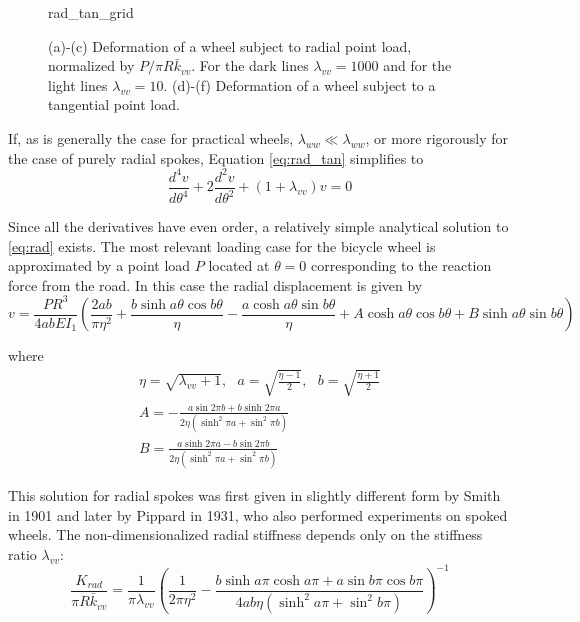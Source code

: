 \documentclass[../thesis.tex]{subfiles}
\newcommand{\dt}[2]{\frac{d^#2#1}{d\theta^#2}}
\begin{document}
\begin{figure}
\centering
{rad_tan_grid}
\caption{(a)-(c) Deformation of a wheel subject to radial point load, normalized by $P/\pi R\bar{k}_{vv}$. For the dark lines $\lambda_{vv}=1000$ and for the light lines $\lambda_{vv}=10$. (d)-(f) Deformation of a wheel subject to a tangential point load.}
\label{fig:rad_tan_grid}
\end{figure}

If, as is generally the case for practical wheels, $\lambda_{ww} \ll \lambda_{ww}$, or more rigorously for the case of purely radial spokes, Equation \eqref{eq:rad_tan} simplifies to
\begin{equation}
\label{eq:rad}
\dt{v}{4} + 2\dt{v}{2} + (1+\lambda_{vv})v=0
\end{equation}

Since all the derivatives have even order, a relatively simple analytical solution to \eqref{eq:rad} exists. The most relevant loading case for the bicycle wheel is approximated by a point load $P$ located at $\theta=0$ corresponding to the reaction force from the road. In this case the radial displacement is given by
\begin{equation}
\label{eq:rad_soln}
v = \frac{PR^3}{4abEI_1} \left( \frac{2ab}{\pi\eta^2} + \frac{b\sinh{a\theta}\cos{b\theta}}{\eta} 
                               -\frac{a\cosh{a\theta}\sin{b\theta}}{\eta}
                               +A\cosh{a\theta}\cos{b\theta} + B\sinh{a\theta}\sin{b\theta}\right)
\end{equation}

where
\begin{gather*}
\eta=\sqrt{\lambda_{vv} + 1}, \,\,\,\, a=\sqrt{\frac{\eta-1}{2}}, \,\,\,\, b=\sqrt{\frac{\eta+1}{2}}\\
A = -\frac{a\sin{2\pi b} + b\sinh{2\pi a}}{2\eta(\sinh^2{\pi a} + \sin^2{\pi b})}\\
B =  \frac{a\sinh{2\pi a} - b\sin{2\pi b}}{2\eta(\sinh^2{\pi a} + \sin^2{\pi b})}
\end{gather*}

This solution for radial spokes was first given in slightly different form by Smith\cite{Smith} in 1901 and later by Pippard\cite{Pippard} in 1931, who also performed experiments on spoked wheels. The non-dimensionalized radial stiffness depends only on the stiffness ratio $\lambda_{vv}$:
\begin{equation}
\label{eq:Krad}
\frac{K_{rad}}{\pi R \bar{k}_{vv}} =
    \frac{1}{\pi\lambda_{vv}} \left(\frac{1}{2\pi\eta^2}
                                    -\frac{b\sinh{a\pi}\cosh{a\pi} + a\sin{b\pi}\cos{b\pi}}
                                     {4ab\eta (\sinh^2{a\pi} + \sin^2{b\pi})} \right)^{-1}
\end{equation}
\end{document}
